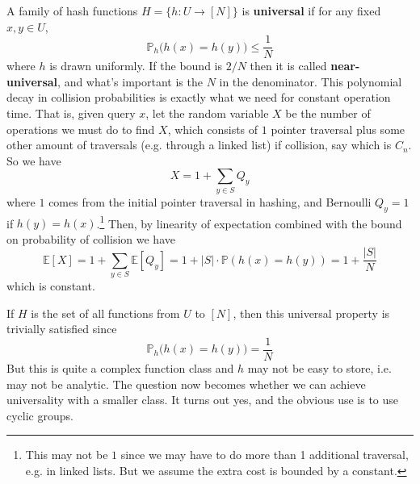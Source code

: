 \documentclass{article}
\begin{document}
    \begin{definition}
      A family of hash functions $H = \{h : U \rightarrow [N] \}$ is \textbf{universal} if for any fixed $x, y \in U$, 
      \begin{equation}
        \mathbb{P}_{h} \big( h(x) = h(y) \big) \leq \frac{1}{N}
      \end{equation}
      where $h$ is drawn uniformly. If the bound is $2/N$ then it is called \textbf{near-universal}, and what's important is the $N$ in the denominator. This polynomial decay in collision probabilities is exactly what we need for constant operation time. That is, given query $x$, let the random variable $X$ be the number of operations we must do to find $X$, which consists of $1$ pointer traversal plus some other amount of traversals (e.g. through a linked list) if collision, say which is $C_n$. So we have 
      \begin{equation}
        X = 1 + \sum_{y \in S} Q_y
      \end{equation}
      where $1$ comes from the initial pointer traversal in hashing, and Bernoulli $Q_y = 1$ if $h(y) = h(x)$.\footnote{This may not be $1$ since we may have to do more than 1 additional traversal, e.g. in linked lists. But we assume the extra cost is bounded by a constant.} Then, by linearity of expectation combined with the bound on probability of collision we have 
      \begin{equation}
        \mathbb{E}[X] = 1 + \sum_{y \in S} \mathbb{E}[Q_y] = 1 + |S| \cdot \mathbb{P}(h(x) = h(y)) = 1 + \frac{|S|}{N}
      \end{equation} 
      which is constant. 
    \end{definition} 

    If $H$ is the set of all functions from $U$ to $[N]$, then this universal property is trivially satisfied since 
    \begin{equation}
        \mathbb{P}_{h} \big( h(x) = h(y) \big) = \frac{1}{N}
    \end{equation}
    But this is quite a complex function class and $h$ may not be easy to store, i.e. may not be analytic. The question now becomes whether we can achieve universality with a smaller class. It turns out yes, and the obvious use is to use cyclic groups. 
\end{document}
